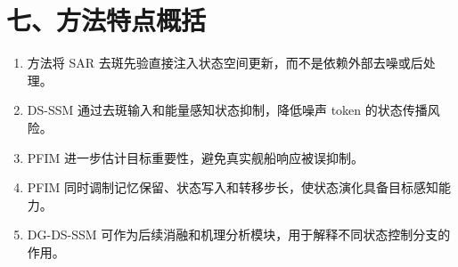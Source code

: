 \documentclass[UTF8,10pt]{ctexart}
\begin{document}
\section*{七、方法特点概括}

\begin{enumerate}
  \item 方法将 SAR 去斑先验直接注入状态空间更新，而不是依赖外部去噪或后处理。
  \item DS-SSM 通过去斑输入和能量感知状态抑制，降低噪声 token 的状态传播风险。
  \item PFIM 进一步估计目标重要性，避免真实舰船响应被误抑制。
  \item PFIM 同时调制记忆保留、状态写入和转移步长，使状态演化具备目标感知能力。
  \item DG-DS-SSM 可作为后续消融和机理分析模块，用于解释不同状态控制分支的作用。
\end{enumerate}
\end{document}
